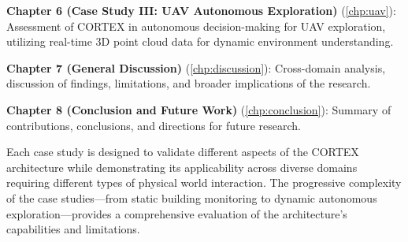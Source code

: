 \textbf{Chapter 6 (Case Study III: UAV Autonomous Exploration)} (\autoref{chp:uav}): Assessment of CORTEX in autonomous decision-making for UAV exploration, utilizing real-time 3D point cloud data for dynamic environment understanding.

\textbf{Chapter 7 (General Discussion)} (\autoref{chp:discussion}): Cross-domain analysis, discussion of findings, limitations, and broader implications of the research.

\textbf{Chapter 8 (Conclusion and Future Work)} (\autoref{chp:conclusion}): Summary of contributions, conclusions, and directions for future research.

Each case study is designed to validate different aspects of the CORTEX architecture while demonstrating its applicability across diverse domains requiring different types of physical world interaction. The progressive complexity of the case studies—from static building monitoring to dynamic autonomous exploration—provides a comprehensive evaluation of the architecture's capabilities and limitations.